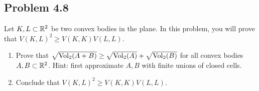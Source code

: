 \documentclass[12pt]{article}
\begin{document}
\newpage 

\subsection{Problem 4.8}

\begin{problem} \label{problem-4.8}
	Let $K, L \subset \mathbb{R}^2$ be two convex bodies in the plane. In this problem, you will prove that $V(K, L)^2 \geq V(K, K) V(L, L)$.
    \begin{enumerate}[label = (\alph*)]
        \item Prove that $\sqrt{\operatorname{Vol}_2(A + B)} \geq \sqrt{\operatorname{Vol}_2(A)} + \sqrt{\operatorname{Vol}_2(B)}$ for all convex bodies $A, B \subset \mathbb{R}^2$. Hint: first approximate $A, B$ with finite unions of closed cells. 
        
        \item Conclude that $V(K, L)^2 \geq V(K, K) V(L, L)$. 
    \end{enumerate}
\end{problem}
\end{document}
